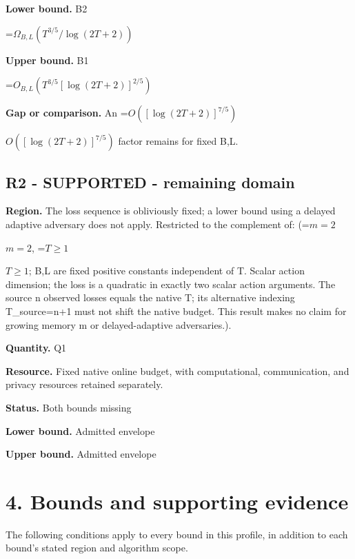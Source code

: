 \documentclass[10pt,a4paper]{article}
\newcommand{\AtlasMath}[1]{\par\begingroup\centering\setbox0=\hbox{$\displaystyle #1$}\ifdim\wd0>1.4\linewidth\typeout{ATLAS WIDE FORMULA: \the\wd0}\fi\ifdim\wd0>\linewidth\resizebox{\linewidth}{!}{\box0}\else\box0\fi\par\endgroup}
\newcommand{\AtlasInlineMath}[1]{\begingroup\setbox0=\hbox{$#1$}\ifdim\wd0>.4\linewidth\endgroup\AtlasMath{#1}\else\endgroup$#1$\fi}
\begin{document}
\textbf{Lower bound.} B2



\AtlasMath{\Omega_{B,L}\!\left(T^{3/5}/\log(2T+2)\right)}


\textbf{Upper bound.} B1



\AtlasMath{O_{B,L}\!\left(T^{3/5}[\log(2T+2)]^{2/5}\right)}


\textbf{Gap or comparison.} An \AtlasInlineMath{O([\log(2T+2)]^{7/5})} factor remains for fixed B,L.



\subsection{R2 - SUPPORTED - remaining domain}


\textbf{Region.} The loss sequence is obliviously fixed; a lower bound using a delayed adaptive adversary does not apply. Restricted to the complement of: (\AtlasInlineMath{m=2}, \AtlasInlineMath{T\ge1}; B,L are fixed positive constants independent of T. Scalar action dimension; the loss is a quadratic in exactly two scalar action arguments. The source n observed losses equals the native T; its alternative indexing T\_source=n+1 must not shift the native budget. This result makes no claim for growing memory m or delayed-adaptive adversaries.).



\textbf{Quantity.} Q1



\textbf{Resource.} Fixed native online budget, with computational, communication, and privacy resources retained separately.



\textbf{Status.} Both bounds missing



\textbf{Lower bound.} Admitted envelope



\textbf{Upper bound.} Admitted envelope



\section{4. Bounds and supporting evidence}


The following conditions apply to every bound in this profile, in addition to each bound's stated region and algorithm scope.
\end{document}
